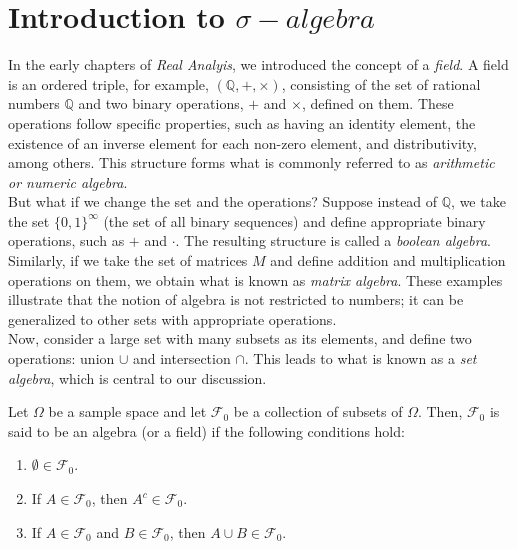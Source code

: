 \section{Introduction to $\sigma-algebra$}

In the early chapters of \textit{Real Analyis}, we introduced the concept of a \textit{field}. A field is an ordered triple, for example, $(\mathbb{Q}, +, \times)$, consisting of the set of rational numbers $\mathbb{Q}$ and two binary operations, $+$ and $\times$, defined on them. These operations follow specific properties, such as having an identity element, the existence of an inverse element for each non-zero element, and distributivity, among others. This structure forms what is commonly referred to as \textit{arithmetic or numeric algebra}.\\

But what if we change the set and the operations? Suppose instead of $\mathbb{Q}$, we take the set $\{0, 1\}^{\infty}$ (the set of all binary sequences) and define appropriate binary operations, such as $+$ and $\cdot$. The resulting structure is called a \textit{boolean algebra}. \\

Similarly, if we take the set of matrices $M$ and define addition and multiplication operations on them, we obtain what is known as \textit{matrix algebra}. These examples illustrate that the notion of algebra is not restricted to numbers; it can be generalized to other sets with appropriate operations.\\

Now, consider a large set with many subsets as its elements, and define two operations: union $\cup$ and intersection $\cap$. This leads to what is known as a \textit{set algebra}, which is central to our discussion.\\

\begin{definition}
    Let $\Omega$ be a sample space and let $\mathcal{F}_0$ be a collection of subsets of $\Omega$. Then, $\mathcal{F}_0$ is said to be an algebra (or a field) if the following conditions hold:
\begin{enumerate}
    \item $\emptyset \in \mathcal{F}_0$.
    \item If $A \in \mathcal{F}_0$, then $A^c \in \mathcal{F}_0$.
    \item If $A \in \mathcal{F}_0$ and $B \in \mathcal{F}_0$, then $A \cup B \in \mathcal{F}_0$.
\end{enumerate}
\end{definition}

